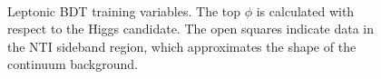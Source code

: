 \begin{figure}[htbp]
	\\
  \caption{Leptonic BDT training variables. The top $\phi$ is calculated with respect to the Higgs candidate. The open squares indicate data in the NTI sideband region, which approximates the shape of the continuum background.}
  \label{fig:lepvbls1}
\end{figure}	
	
